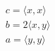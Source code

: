 \documentclass[preview]{standalone}
\begin{document}
\begin{align*}
& c=\langle x,x \rangle \\& b= 2\langle x,y \rangle \\& a=\langle y,y \rangle \\&
\end{align*}
\end{document}
